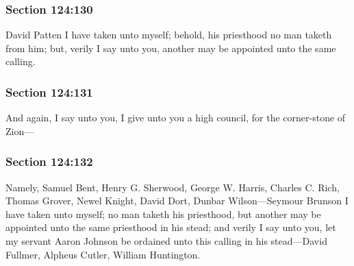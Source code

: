 	\subsubsection{Section 124:130} %
		\label{DC124-130}

		David Patten I have taken unto myself; behold, his priesthood no man taketh from him; but, verily I say unto you, another may be appointed unto the same calling.


	\subsubsection{Section 124:131} %
		\label{DC124-131}

		And again, I say unto you, I give unto you a high council, for the corner-stone of Zion---


	\subsubsection{Section 124:132} %
		\label{DC124-132}

		Namely, Samuel Bent, Henry G. Sherwood, George W. Harris, Charles C. Rich, Thomas Grover, Newel Knight, David Dort, Dunbar Wilson---Seymour Brunson I have taken unto myself; no man taketh his priesthood, but another may be appointed unto the same priesthood in his stead; and verily I say unto you, let my servant Aaron Johnson be ordained unto this calling in his stead---David Fullmer, Alpheus Cutler, William Huntington.

